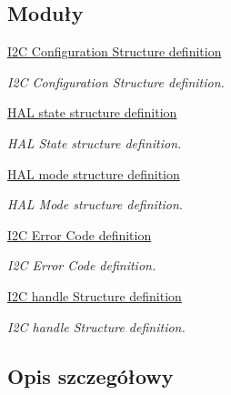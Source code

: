 \subsection*{Moduły}
\begin{DoxyCompactItemize}
\item 
\hyperlink{group___i2_c___configuration___structure__definition}{I2\+C Configuration Structure definition}
\begin{DoxyCompactList}\small\item\em I2C Configuration Structure definition. \end{DoxyCompactList}\item 
\hyperlink{group___h_a_l__state__structure__definition}{H\+A\+L state structure definition}
\begin{DoxyCompactList}\small\item\em H\+AL State structure definition. \end{DoxyCompactList}\item 
\hyperlink{group___h_a_l__mode__structure__definition}{H\+A\+L mode structure definition}
\begin{DoxyCompactList}\small\item\em H\+AL Mode structure definition. \end{DoxyCompactList}\item 
\hyperlink{group___i2_c___error___code__definition}{I2\+C Error Code definition}
\begin{DoxyCompactList}\small\item\em I2C Error Code definition. \end{DoxyCompactList}\item 
\hyperlink{group___i2_c__handle___structure__definition}{I2\+C handle Structure definition}
\begin{DoxyCompactList}\small\item\em I2C handle Structure definition. \end{DoxyCompactList}\end{DoxyCompactItemize}


\subsection{Opis szczegółowy}
